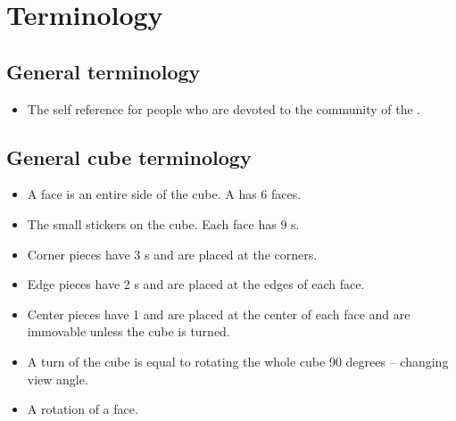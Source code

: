 \chapter{Terminology}


\section{General terminology}
\begin{itemize}
\item {}The self reference for people who are devoted to the community of the \rubik{}. 
\end{itemize}

\section{General cube terminology}
\label{sec:generalNotation}
\begin{itemize}
\item {}A face is an entire side of the cube. A \rubik{} has 6 faces.
\item {}The small stickers on the cube. Each face has 9 \facet{}s.
\item {}Corner pieces have 3 \facet{}s and are placed at the corners. 
\item {}Edge pieces have 2 \facet{}s and are placed at the edges of each face. 
\item {}Center pieces have 1 \facet{} and are placed at the center of each face and are immovable unless the cube is turned. 
\item {}A turn of the cube is equal to rotating the whole cube 90 degrees -- changing view angle.
\item {}A rotation of a face.%
\end{itemize}

